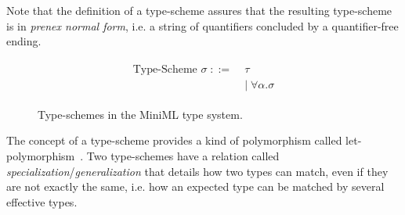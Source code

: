 Note that the definition of a type-scheme assures that the resulting type-scheme is in \emph{prenex normal form}, i.e. a string of quantifiers concluded by a quantifier-free ending.


\begin{figure}[!htb]
\begin{align*}
\begin{aligned}
\text{Type-Scheme } \sigma \; ::= \; &\tau \\
&| \; \forall \alpha . \sigma
\end{aligned}
\end{align*}
\caption{Type-schemes in the MiniML type system.}
\label{fig:MiniMLTypeSchemes}
\end{figure}

The concept of a type-scheme provides a kind of polymorphism called let-poly\-morphism~\cite{Pierce}.
Two type-schemes have a relation called \emph{specialization}/\emph{generalization} that details how two types can match, even if they are not exactly the same, i.e. how an expected type can be matched by several effective types.

